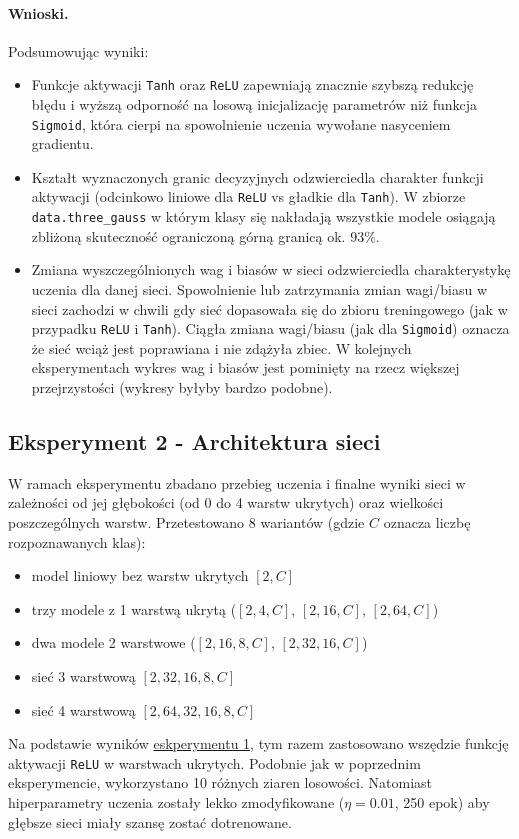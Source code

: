 \documentclass[11pt,a4paper]{article}
\begin{document}
\paragraph{Wnioski.}
Podsumowując wyniki:
\begin{itemize}
    \item Funkcje aktywacji \texttt{Tanh} oraz \texttt{ReLU} zapewniają znacznie szybszą redukcję błędu i wyższą odporność na losową inicjalizację parametrów niż funkcja \texttt{Sigmoid},
    która cierpi na spowolnienie uczenia wywołane nasyceniem gradientu.
    \item Kształt wyznaczonych granic decyzyjnych odzwierciedla charakter funkcji aktywacji (odcinkowo liniowe dla \texttt{ReLU} vs gładkie dla \texttt{Tanh}).
    W zbiorze \texttt{data.three\_gauss} w którym klasy się nakładają wszystkie modele osiągają zbliżoną skuteczność ograniczoną górną granicą ok. $93\%$.
    \item Zmiana wyszczególnionych wag i biasów w sieci odzwierciedla charakterystykę uczenia dla danej sieci. 
    Spowolnienie lub zatrzymania zmian wagi/biasu w sieci zachodzi w chwili gdy sieć dopasowała się do zbioru treningowego (jak w przypadku \texttt{ReLU} i \texttt{Tanh}).
    Ciągła zmiana wagi/biasu (jak dla \texttt{Sigmoid}) oznacza że sieć wciąż jest poprawiana i nie zdążyła zbiec. W kolejnych eksperymentach
    wykres wag i biasów jest pominięty na rzecz większej przejrzystości (wykresy byłyby bardzo podobne).
    
\end{itemize}

\subsection{Eksperyment 2 - Architektura sieci}
\label{sec:K2}

W ramach eksperymentu zbadano przebieg uczenia i finalne wyniki sieci w zależności od jej głębokości (od 0 do 4 warstw ukrytych) oraz wielkości poszczególnych warstw.
Przetestowano 8 wariantów (gdzie $C$ oznacza liczbę rozpoznawanych klas):
\begin{itemize}
    \item model liniowy bez warstw ukrytych $[2, C]$
    \item trzy modele z 1 warstwą ukrytą ($[2, 4, C]$, $[2, 16, C]$, $[2, 64, C]$)
    \item dwa modele 2 warstwowe ($[2, 16, 8, C]$, $[2, 32, 16, C]$)
    \item sieć 3 warstwową $[2, 32, 16, 8, C]$
    \item sieć 4 warstwową $[2, 64, 32, 16, 8, C]$
\end{itemize}
Na podstawie wyników \hyperref[sec:K1]{eskperymentu 1}, tym razem zastosowano wszędzie funkcję aktywacji \texttt{ReLU}
w warstwach ukrytych. Podobnie jak w poprzednim eksperymencie, wykorzystano 10 różnych ziaren losowości. Natomiast hiperparametry uczenia zostały lekko zmodyfikowane 
($\eta = 0.01$, 250 epok) aby głębsze sieci miały szansę zostać dotrenowane.
\end{document}

